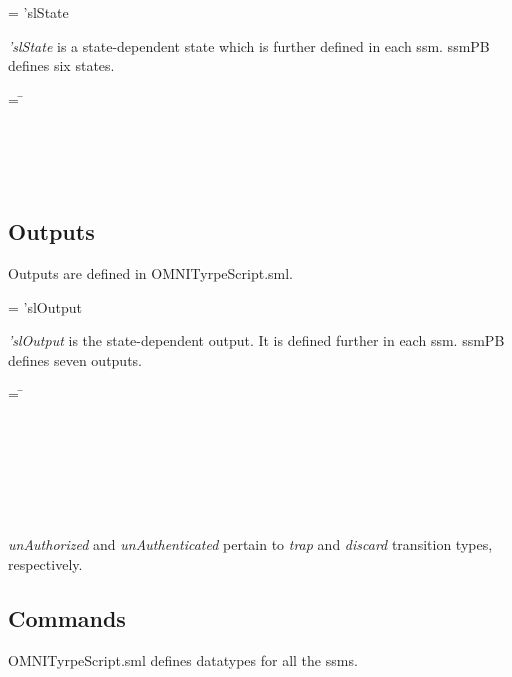 \documentclass[../../main/main.tex]{subfiles}
\begin{document}
 =   \HOLTokenBar{}  'slState

\textit{'slState} is a state-dependent state which is further defined in each \gls{ssm}.  ssmPB defines six states.

\begin{tabbing}
 = \= \\
					\>\HOLTokenBar{}  \\
					\>\HOLTokenBar{}  \\
					\>\HOLTokenBar{} \\
        					\>\HOLTokenBar{}  \\
					\>\HOLTokenBar{} 
\end{tabbing}

\subsection{Outputs}
Outputs are defined in OMNITyrpeScript.sml.

 =   \HOLTokenBar{}  'slOutput

 \textit{'slOutput} is the state-dependent output.  It is defined further in each \gls{ssm}.  ssmPB defines seven outputs.

\begin{tabbing}
 = \= \\
					\>\HOLTokenBar{}  \\
					\>\HOLTokenBar{}  \\
					\>\HOLTokenBar{} \\
         				\>\HOLTokenBar{}  \\
					\>\HOLTokenBar{}  \\
					\>\HOLTokenBar{} \\
         				\>\HOLTokenBar{} 
\end{tabbing}

\textit{unAuthorized} and \textit{unAuthenticated} pertain to \textit{trap} and \textit{discard} transition types, respectively.

\subsection{Commands}
OMNITyrpeScript.sml defines datatypes for all the \glspl{ssm}.
\end{document}
